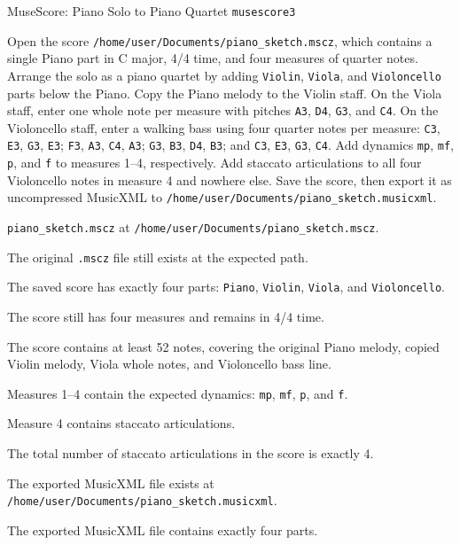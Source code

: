 \begin{taskexample}{MuseScore: Piano Solo to Piano Quartet}
 \texttt{musescore3}

 Open the score
\texttt{/home/user/Documents/piano\_sketch.mscz}, which contains a single
Piano part in C major, 4/4 time, and four measures of quarter notes. Arrange
the solo as a piano quartet by adding \texttt{Violin}, \texttt{Viola}, and
\texttt{Violoncello} parts below the Piano. Copy the Piano melody to the
Violin staff. On the Viola staff, enter one whole note per measure with pitches
\texttt{A3}, \texttt{D4}, \texttt{G3}, and \texttt{C4}. On the Violoncello
staff, enter a walking bass using four quarter notes per measure:
\texttt{C3}, \texttt{E3}, \texttt{G3}, \texttt{E3};
\texttt{F3}, \texttt{A3}, \texttt{C4}, \texttt{A3};
\texttt{G3}, \texttt{B3}, \texttt{D4}, \texttt{B3};
and \texttt{C3}, \texttt{E3}, \texttt{G3}, \texttt{C4}. Add dynamics
\texttt{mp}, \texttt{mf}, \texttt{p}, and \texttt{f} to measures 1--4,
respectively. Add staccato articulations to all four Violoncello notes in
measure 4 and nowhere else. Save the score, then export it as uncompressed
MusicXML to \texttt{/home/user/Documents/piano\_sketch.musicxml}.

\texttt{piano\_sketch.mscz} at
\texttt{/home/user/Documents/piano\_sketch.mscz}.

\begin{compactitem}
    \item The original \texttt{.mscz} file still exists at the expected path.
    \item The saved score has exactly four parts: \texttt{Piano},
    \texttt{Violin}, \texttt{Viola}, and \texttt{Violoncello}.
    \item The score still has four measures and remains in 4/4 time.
    \item The score contains at least 52 notes, covering the original Piano
    melody, copied Violin melody, Viola whole notes, and Violoncello bass line.
    \item Measures 1--4 contain the expected dynamics:
    \texttt{mp}, \texttt{mf}, \texttt{p}, and \texttt{f}.
    \item Measure 4 contains staccato articulations.
    \item The total number of staccato articulations in the score is exactly 4.
    \item The exported MusicXML file exists at
    \texttt{/home/user/Documents/piano\_sketch.musicxml}.
    \item The exported MusicXML file contains exactly four parts.
\end{compactitem}
\end{taskexample}


